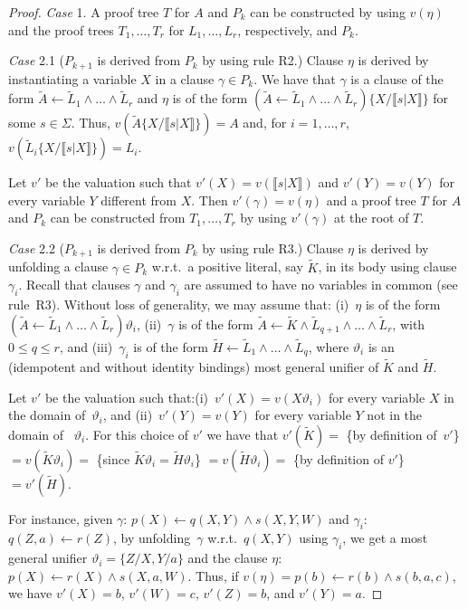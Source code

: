 \documentclass[english]{tlp}
\newcommand{\If}{\leftarrow}
\newcommand{\tA}{{\widetilde{A}}}
\newcommand{\tH}{{\widetilde{H}}}
\newcommand{\tK}{{\widetilde{K}}}
\newcommand{\tL}{{\widetilde{L}}}
\begin{document}
\begin{proof}
\medskip

\noindent \emph{Case} 1. A proof tree $T$ for $A$ and $ P_k$ can be constructed by using $v(\eta)$ and the proof trees 
$T_1,\ldots,T_r$ for $L_1,\ldots,L_r$, respectively, and $P_k$.

\medskip

\noindent \emph{Case} 2.1 ($P_{k+1}$ is derived from $P_k$ by using
rule R2.) Clause \( \eta  \) is derived by instantiating a variable
$X$ in a clause $\gamma\in  P_k$. We have that $\gamma$ is a clause
of the form $\tA \leftarrow \tL_1\wedge\ldots \wedge\tL_r$ and $\eta$ is of the form $(\tA\leftarrow
\tL_1\wedge\ldots \wedge\tL_r)\{X/\llbracket s|X\rrbracket \}$ for some $s\in\Sigma$. Thus,
$v(\tA\{X/\llbracket s|X\rrbracket \})=A$ and, for $i\!=\!1,\ldots,r$,
$v(\tL_i\{X/\llbracket s|X\rrbracket \})=L_i$.

Let $v'$ be the valuation
such that $v'(X)=v(\llbracket s|X\rrbracket) $ and $v'(Y)=v(Y)$ for
every variable $Y$ different from $X$. Then $v'(\gamma) = v(\eta)$
and a proof tree $T$ for $A$ and $ P_k$ can be constructed from
$T_1,\ldots,T_r$ by using $v'(\gamma)$ at the root of $T$.

\medskip

\noindent \emph{Case} 2.2 ($P_{k+1}$ is derived from $P_k$ by using
rule R3.)  Clause \( \eta  \) is derived by unfolding a clause
$\gamma\in  P_k$ w.r.t.~a positive literal, say $\tK$, in its body using
clause $\gamma_i$. Recall that clauses $\gamma$ and $\gamma_i$ are 
assumed to have no variables in common (see rule~R3). Without loss
of generality, we may assume that: (i)~$\eta$
 is of the form $(\tA\leftarrow \tL_{1}\wedge \ldots \wedge \tL_{r})\vartheta_i$,
(ii)~$\gamma$ is of the form $\tA\leftarrow \tK \wedge \tL_{q+1}\wedge \ldots \wedge \tL_{r}$, with $0\!\leq\!q\!\leq\!r$, and
(iii)~$\gamma_i$ is of the form $\tH\leftarrow \tL_{1}\wedge \ldots \wedge \tL_{q}$, where $\vartheta_i$ is an (idempotent and 
 without identity bindings) most general unifier of $\tK$ and $\tH$.

Let $v'$ be the valuation
such that:(i)~$v'(X)=v(X\vartheta_i)$ for every variable $X$ in the domain of~$\vartheta_i $, and (ii)~$v'(Y)=v(Y)$ for every variable $Y$ not in the domain of ~$\vartheta_i$. For this choice of $v'$ we have that
   $v'(\tK)=$ \{by definition of~$v'$\} $=v(\tK\vartheta_i)=$ \{since $\tK\vartheta_i=\tH\vartheta_i$\} $=v(\tH\vartheta_i)=$ \{by definition of $v'$\} $=v'(\tH)$.
   
For instance, given $\gamma$: $p(X)\If q(X,Y) \wedge s(X,Y,W)$ and
 $\gamma_i$: $q(Z,a)\If r(Z)$, by unfolding~$\gamma$ w.r.t.~$q(X,Y)$
 using $\gamma_i$, we get a most general unifier $\vartheta_i=\{Z/X,Y/a\}$ 
  and the clause $\eta$: $p(X)\If r(X) \wedge s(X,a,W)$. 
 Thus, if $v(\eta)\!=\!p(b)\If r(b) \wedge s(b,a,c)$,
   we have $v'(X)\!=\!b$, $v'(W)\!=\!c$, $v'(Z)\!=\!b$, and
  $v'(Y)\!=\!a$.  



\end{proof}
\end{document}
